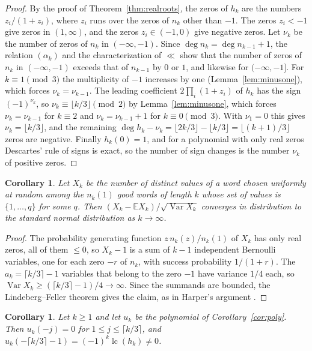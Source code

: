 \documentclass[11pt]{amsart}
\newtheorem{corollary}[theorem]{Corollary}
\theoremstyle{definition}
\DeclareMathOperator{\lc}{lc}
\begin{document}
\begin{proof}
By the proof of Theorem~\ref{thm:realroots}, the zeros of $h_k$ are the numbers $z_i/(1+z_i)$, where $z_i$ runs over the zeros of $n_k$ other than $-1$. The zeros $z_i<-1$ give zeros in $(1,\infty)$, and the zeros $z_i\in(-1,0)$ give negative zeros. Let $\nu_k$ be the number of zeros of $n_k$ in $(-\infty,-1)$. Since $\deg n_k=\deg n_{k-1}+1$, the relation $(\alpha_k)$ and the characterization of $\ll$ show that the number of zeros of $n_k$ in $(-\infty,-1)$ exceeds that of $n_{k-1}$ by $0$ or $1$, and likewise for $(-\infty,-1]$. For $k\equiv1\pmod3$ the multiplicity of $-1$ increases by one (Lemma~\ref{lem:minusone}), which forces $\nu_k=\nu_{k-1}$. The leading coefficient $2\prod_i(1+z_i)$ of $h_k$ has the sign $(-1)^{\nu_k}$, so $\nu_k\equiv\lfloor k/3\rfloor\pmod2$ by Lemma~\ref{lem:minusone}, which forces $\nu_k=\nu_{k-1}$ for $k\equiv2$ and $\nu_k=\nu_{k-1}+1$ for $k\equiv0\pmod3$. With $\nu_1=0$ this gives $\nu_k=\lfloor k/3\rfloor$, and the remaining $\deg h_k-\nu_k=\lfloor2k/3\rfloor-\lfloor k/3\rfloor=\lfloor(k+1)/3\rfloor$ zeros are negative. Finally $h_k(0)=1$, and for a polynomial with only real zeros Descartes' rule of signs is exact, so the number of sign changes is the number $\nu_k$ of positive zeros.
\end{proof}

\begin{corollary}\label{cor:clt}
Let $X_k$ be the number of distinct values of a word chosen uniformly at random among the $n_k(1)$ good words of length $k$ whose set of values is $\{1,\dots,q\}$ for some $q$. Then $(X_k-\mathbb EX_k)/\sqrt{\operatorname{Var}X_k}$ converges in distribution to the standard normal distribution as $k\to\infty$.
\end{corollary}

\begin{proof}
The probability generating function $z\,n_k(z)/n_k(1)$ of $X_k$ has only real zeros, all of them $\le0$, so $X_k-1$ is a sum of $k-1$ independent Bernoulli variables, one for each zero $-r$ of $n_k$, with success probability $1/(1+r)$. The $a_k=\lceil k/3\rceil-1$ variables that belong to the zero $-1$ have variance $1/4$ each, so $\operatorname{Var}X_k\ge(\lceil k/3\rceil-1)/4\to\infty$. Since the summands are bounded, the Lindeberg--Feller theorem gives the claim, as in Harper's argument \cite{Harper}.
\end{proof}

\begin{corollary}\label{cor:negzeros}
Let $k\ge1$ and let $u_k$ be the polynomial of Corollary~\ref{cor:poly}. Then $u_k(-j)=0$ for $1\le j\le\lceil k/3\rceil$, and $u_k(-\lceil k/3\rceil-1)=(-1)^k\lc(h_k)\ne0$.
\end{corollary}
\end{document}
